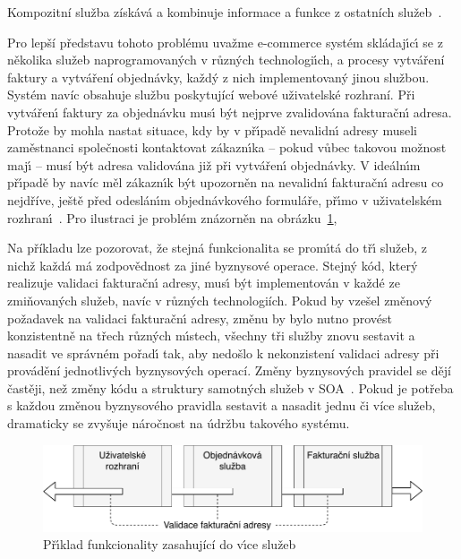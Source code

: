 \begin{definition}
    Kompozitní služba získává a kombinuje informace a funkce z ostatních služeb~\cite{papazoglou2003service}.
\end{definition}

Pro lepší představu tohoto problému uvažme e-commerce systém
skládaj\'{\i}c\'{\i} se z několika služeb naprogramovan\'ych v různ\'ych technologi\'{\i}ch,
a procesy vytváření faktury a vytváření objednávky, každý z nich implementovaný jinou službou.
Systém navíc obsahuje službu poskytující webové uživatelské rozhraní.
Při vytvářen\'{\i} faktury za objednávku mus\'{\i} b\'yt nejprve zvalidována fakturačn\'{\i} adresa.
Protože by mohla nastat situace, kdy by v př\'{\i}padě nevalidn\'{\i} adresy museli zaměstnanci
společnosti kontaktovat zákazn\'{\i}ka -- pokud vůbec takovou možnost maj\'{\i}
-- musí být adresa validována již při vytvářen\'{\i} objednávky.
V ideáln\'{\i}m př\'{\i}padě by navíc měl zákazn\'{\i}k být upozorněn na nevalidn\'{\i} fakturačn\'{\i}
adresu co nejdříve, ještě před odeslán\'{\i}m objednávkového formuláře, př\'{\i}mo v uživatelském
rozhran\'{\i}~\cite{cemus2017separation}. Pro ilustraci je problém znázorněn na obrázku~\ref{fig:service-cutting},

Na příkladu lze pozorovat, že stejná funkcionalita se prom\'{\i}tá
do tř\'{\i} služeb, z nichž každá má zodpovědnost za jiné byznysové operace.
Stejn\'y kód, kter\'y realizuje validaci fakturačn\'{\i} adresy,
mus\'{\i} b\'yt implementován v každé ze zmiňovaných služeb, navíc v různých technologiích.
Pokud by vzešel změnový požadavek na validaci fakturačn\'{\i} adresy, změnu by bylo nutno
provést konzistentně na třech různ\'ych m\'{\i}stech, všechny tři služby znovu
sestavit a nasadit ve správném pořad\'{\i} tak, aby nedošlo k nekonzistení validaci adresy
při provádění jednotlivých byznysových operací. Změny byznysových pravidel se dějí častěji,
než změny kódu a struktury samotných služeb v \gls{SOA}~\cite{rosenberg2005business}.
Pokud je potřeba s každou změnou byznysového pravidla sestavit a nasadit jednu či více služeb,
dramaticky se zvyšuje náročnost na údržbu takového systému.

\begin{figure}
    \centering
    \includegraphics[keepaspectratio=true, width=0.8\linewidth]{figures/service-cutting.pdf}
    \caption{Př\'{\i}klad funkcionality zasahující do v\'{\i}ce služeb}
    \label{fig:service-cutting}
\end{figure}

